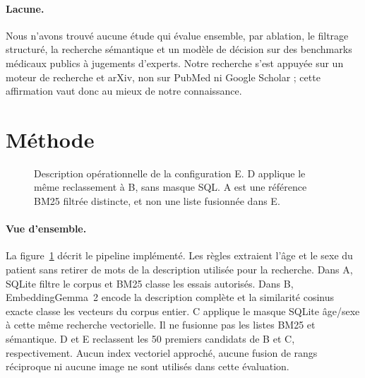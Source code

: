 \documentclass{article}
\begin{document}
\paragraph{Lacune.} Nous n'avons trouvé aucune étude qui évalue ensemble, par ablation, le filtrage structuré, la recherche sémantique et un modèle de décision sur des benchmarks médicaux publics à jugements d'experts. Notre recherche s'est appuyée sur un moteur de recherche et arXiv, non sur PubMed ni Google Scholar ; cette affirmation vaut donc au mieux de notre connaissance.

\section{Méthode}
\label{sec:method}

\begin{figure}[t]
  \centering
  \caption{Description opérationnelle de la configuration E. D applique le même reclassement à B, sans masque SQL. A est une référence BM25 filtrée distincte, et non une liste fusionnée dans E.}
  \label{fig:architecture}
\end{figure}

\paragraph{Vue d'ensemble.} La figure~\ref{fig:architecture} décrit le pipeline implémenté. Les règles extraient l'âge et le sexe du patient sans retirer de mots de la description utilisée pour la recherche. Dans A, SQLite filtre le corpus et BM25 classe les essais autorisés. Dans B, EmbeddingGemma~2 encode la description complète et la similarité cosinus exacte classe les vecteurs du corpus entier. C applique le masque SQLite âge/sexe à cette même recherche vectorielle. Il ne fusionne pas les listes BM25 et sémantique. D et E reclassent les 50 premiers candidats de B et C, respectivement. Aucun index vectoriel approché, aucune fusion de rangs réciproque ni aucune image ne sont utilisés dans cette évaluation.
\end{document}
